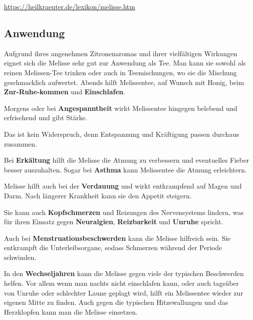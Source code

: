 \cite{heilkraeuterlexikon}  

\url{https://heilkraeuter.de/lexikon/melisse.htm}

           

\subsection{Anwendung}

Aufgrund ihres angenehmen Zitronenaromas und ihrer vielfältigen Wirkungen eignet sich die Melisse sehr gut zur Anwendung als Tee. Man kann sie sowohl als reinen Melissen-Tee trinken oder auch in Teemischungen, wo sie die Mischung geschmacklich aufwertet.
Abends hilft Melissentee, auf Wunsch mit Honig, beim \textbf{Zur-Ruhe-kommen} und \textbf{Einschlafen}.

Morgens oder bei \textbf{Angespanntheit} wirkt Melissentee hingegen belebend und erfrischend und gibt Stärke.

Das ist kein Widerspruch, denn Entspannung und Kräftigung passen durchaus zusammen.

Bei \textbf{Erkältung} hilft die Melisse die Atmung zu verbessern und eventuelles Fieber besser auszuhalten. Sogar bei \textbf{Asthma} kann Melissentee die Atmung erleichtern.

Melisse hilft auch bei der \textbf{Verdauung} und wirkt entkrampfend auf Magen und Darm. Nach längerer Krankheit kann sie den Appetit steigern.

Sie kann auch \textbf{Kopfschmerzen} und Reizungen des Nervensystems lindern, was für ihren Einsatz gegen \textbf{Neuralgien}, \textbf{Reizbarkeit} und \textbf{Unruhe} spricht.

Auch bei \textbf{Menstruationsbeschwerden} kann die Melisse hilfreich sein. Sie entkrampft die Unterleibsorgane, sodass Schmerzen während der Periode schwinden.

In den \textbf{Wechseljahren} kann die Melisse gegen viele der typischen Beschwerden helfen. Vor allem wenn man nachts nicht einschlafen kann, oder auch tagsüber von Unruhe oder schlechter Laune geplagt wird, hilft ein Melissentee wieder zur eigenen Mitte zu finden. Auch gegen die typischen Hitzewallungen und das Herzklopfen kann man die Melisse einsetzen.

